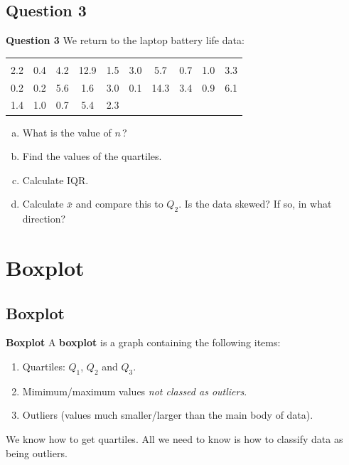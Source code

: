 \documentclass[compress]{beamer}        %
\makeatletter
\newcommand{\tcb}{\textcolor{beamer@blendedblue}}
\makeatother
\begin{document}
\subsection{Question 3}
\begin{frame}{\bf \tcb{Question 3}}
We return to the laptop battery life data:\\
\begin{center}
\begin{tabular}{|cccccccccc|}
\hline
&&&&&&&&&\\[-0.4cm]
2.2 & 0.4 & 4.2 & 12.9 & 1.5 & 3.0 & 5.7  & 0.7 & 1.0 & 3.3 \\
0.2 & 0.2 & 5.6 &  1.6 & 3.0 & 0.1 & 14.3 & 3.4 & 0.9 & 6.1 \\
1.4 & 1.0 & 0.7 & 5.4  & 2.3 &&&&&\\
\hline
\end{tabular}
\end{center}
\begin{enumerate}[a)]\itemsep0.3cm
\item What is the value of $n$\,?
\item Find the values of the quartiles.
\item Calculate IQR.
\item Calculate $\bar x$ and compare this to $Q_2$. Is the data skewed? If so, in what direction?
\end{enumerate}
\end{frame}



\section{Boxplot}
\subsection{Boxplot}
\begin{frame}{\bf \tcb{Boxplot}}
A {\bf boxplot} is a graph containing the following items:\\[0.3cm]
\begin{enumerate}[1.]\itemsep0.6cm
\item Quartiles: $Q_1$, $Q_2$ and $Q_3$.
\item Mimimum/maximum values \emph{not classed as outliers}.
\item Outliers (values much smaller/larger than the main body of data).\\[1cm]
\end{enumerate}

We know how to get quartiles. All we need to know is how to classify data as being outliers.

\end{frame}
\end{document}
